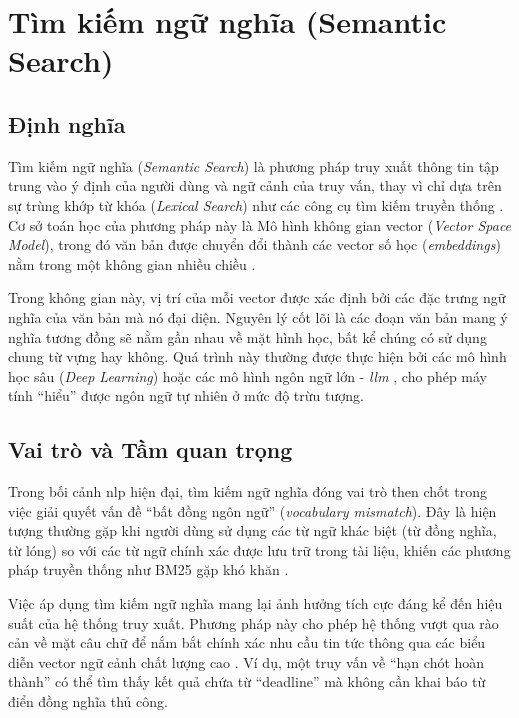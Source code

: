 
\section{Tìm kiếm ngữ nghĩa (Semantic Search)}
\label{sec:semantic_search}

\subsection{Định nghĩa}
Tìm kiếm ngữ nghĩa (\textit{Semantic Search}) là phương pháp truy xuất thông tin tập trung vào ý định của người dùng và ngữ cảnh của truy vấn, thay vì chỉ dựa trên sự trùng khớp từ khóa (\textit{Lexical Search}) như các công cụ tìm kiếm truyền thống \cite{duhan2024semanticsearchrecommendationalgorithm}. Cơ sở toán học của phương pháp này là Mô hình không gian vector (\textit{Vector Space Model}), trong đó văn bản được chuyển đổi thành các vector số học (\textit{embeddings}) nằm trong một không gian nhiều chiều \cite{salton1975vector}.

Trong không gian này, vị trí của mỗi vector được xác định bởi các đặc trưng ngữ nghĩa của văn bản mà nó đại diện. Nguyên lý cốt lõi là các đoạn văn bản mang ý nghĩa tương đồng sẽ nằm gần nhau về mặt hình học, bất kể chúng có sử dụng chung từ vựng hay không. Quá trình này thường được thực hiện bởi các mô hình học sâu (\textit{Deep Learning}) hoặc các mô hình ngôn ngữ lớn - \textit{ \gls{llm} }, cho phép máy tính ``hiểu'' được ngôn ngữ tự nhiên ở mức độ trừu tượng.


\subsection{Vai trò và Tầm quan trọng}
Trong bối cảnh \gls{nlp} hiện đại, tìm kiếm ngữ nghĩa đóng vai trò then chốt trong việc giải quyết vấn đề ``bất đồng ngôn ngữ'' (\textit{vocabulary mismatch}). Đây là hiện tượng thường gặp khi người dùng sử dụng các từ ngữ khác biệt (từ đồng nghĩa, từ lóng) so với các từ ngữ chính xác được lưu trữ trong tài liệu, khiến các phương pháp truyền thống như BM25 gặp khó khăn \cite{karpukhin2020dense}.

Việc áp dụng tìm kiếm ngữ nghĩa mang lại ảnh hưởng tích cực đáng kể đến hiệu suất của hệ thống truy xuất. Phương pháp này cho phép hệ thống vượt qua rào cản về mặt câu chữ để nắm bắt chính xác nhu cầu tin tức thông qua các biểu diễn vector ngữ cảnh chất lượng cao \cite{reimers2019sentence}. Ví dụ, một truy vấn về ``hạn chót hoàn thành'' có thể tìm thấy kết quả chứa từ ``deadline'' mà không cần khai báo từ điển đồng nghĩa thủ công.

